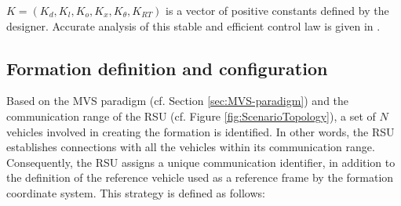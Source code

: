\noindent $K=(K_d, K_l, K_o, K_x, K_\theta, K_{RT})$ is a vector of positive constants defined by the designer. Accurate analysis of this stable and efficient control law is given in \cite{vilca2015novel}\cite{ventura2015safe}. 

\subsection{Formation definition and configuration}\label{sec:formation_modeling_section}







Based on the MVS paradigm (cf. Section \ref{sec:MVS-paradigm}) and the communication range of the RSU (cf. Figure \ref{fig:ScenarioTopology}), a set of $N$ vehicles involved in creating the formation is identified. In other words, the RSU establishes connections with all the vehicles within its communication range. Consequently, the RSU assigns a unique communication identifier, in addition to the definition of the reference vehicle used as a reference frame by the formation coordinate system. This strategy is defined as follows: 

